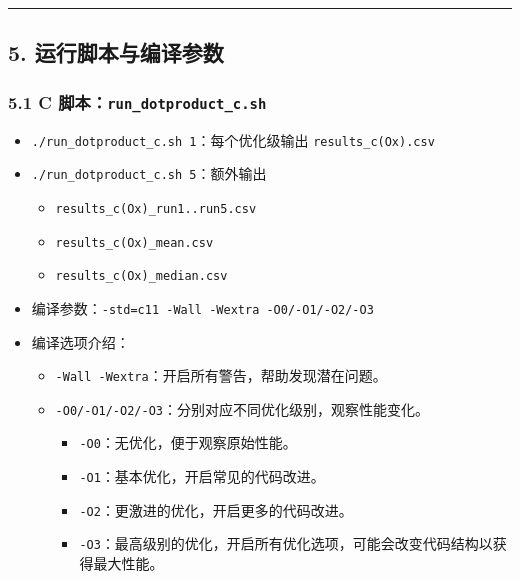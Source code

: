 \documentclass[12pt,fontset=none]{ctexart}
\providecommand{\tightlist}{%
  \setlength{\itemsep}{0pt}\setlength{\parskip}{0pt}}
\begin{document}
\begin{center}\rule{0.5\linewidth}{0.5pt}\end{center}

\subsection{5.
运行脚本与编译参数}\label{5-ux8fd0ux884cux811aux672cux4e0eux7f16ux8bd1ux53c2ux6570}

\subsubsection{\texorpdfstring{5.1 C
脚本：\texttt{run\_dotproduct\_c.sh}}{5.1 C 脚本：run\_dotproduct\_c.sh}}\label{51-c-ux811aux672crun_dotproduct_csh}

\begin{itemize}
\item
  \texttt{./run\_dotproduct\_c.sh\ 1}：每个优化级输出
  \texttt{results\_c(Ox).csv}
\item
  \texttt{./run\_dotproduct\_c.sh\ 5}：额外输出

  \begin{itemize}
  \tightlist
  \item
    \texttt{results\_c(Ox)\_run1..run5.csv}
  \item
    \texttt{results\_c(Ox)\_mean.csv}
  \item
    \texttt{results\_c(Ox)\_median.csv}
  \end{itemize}
\item
  编译参数：\texttt{-std=c11\ -Wall\ -Wextra\ -O0/-O1/-O2/-O3}
\item
  编译选项介绍：

  \begin{itemize}
  \tightlist
  \item
    \texttt{-Wall\ -Wextra}：开启所有警告，帮助发现潜在问题。
  \item
    \texttt{-O0/-O1/-O2/-O3}：分别对应不同优化级别，观察性能变化。

    \begin{itemize}
    \tightlist
    \item
      \texttt{-O0}：无优化，便于观察原始性能。
    \item
      \texttt{-O1}：基本优化，开启常见的代码改进。
    \item
      \texttt{-O2}：更激进的优化，开启更多的代码改进。
    \item
      \texttt{-O3}：最高级别的优化，开启所有优化选项，可能会改变代码结构以获得最大性能。
    \end{itemize}
  \end{itemize}
\end{itemize}
\end{document}
